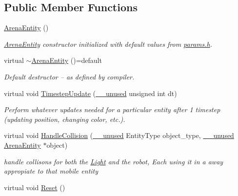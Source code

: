 \subsection*{Public Member Functions}
\begin{DoxyCompactItemize}
\item 
\hyperlink{class_arena_entity_a96df749814e89344a6149e4da89b4e44}{Arena\+Entity} ()\hypertarget{class_arena_entity_a96df749814e89344a6149e4da89b4e44}{}\label{class_arena_entity_a96df749814e89344a6149e4da89b4e44}

\begin{DoxyCompactList}\small\item\em \hyperlink{class_arena_entity}{Arena\+Entity} constructor initialized with default values from \hyperlink{params_8h}{params.\+h}. \end{DoxyCompactList}\item 
virtual \hyperlink{class_arena_entity_aa7af53e5d8830d144ccf2ad07d9140da}{$\sim$\+Arena\+Entity} ()=default\hypertarget{class_arena_entity_aa7af53e5d8830d144ccf2ad07d9140da}{}\label{class_arena_entity_aa7af53e5d8830d144ccf2ad07d9140da}

\begin{DoxyCompactList}\small\item\em Default destructor -- as defined by compiler. \end{DoxyCompactList}\item 
virtual void \hyperlink{class_arena_entity_a203613c40a5cecf47606b2a59adcc3bd}{Timestep\+Update} (\hyperlink{common_8h_a2e3484535ee610c8e19e9859563abe48}{\+\_\+\+\_\+unused} unsigned int dt)
\begin{DoxyCompactList}\small\item\em Perform whatever updates needed for a particular entity after 1 timestep (updating position, changing color, etc.). \end{DoxyCompactList}\item 
virtual void \hyperlink{class_arena_entity_aa9a83946e47cf824ce50325a4599eea8}{Handle\+Collision} (\hyperlink{common_8h_a2e3484535ee610c8e19e9859563abe48}{\+\_\+\+\_\+unused} Entity\+Type object\+\_\+type, \hyperlink{common_8h_a2e3484535ee610c8e19e9859563abe48}{\+\_\+\+\_\+unused} \hyperlink{class_arena_entity}{Arena\+Entity} $\ast$object)
\begin{DoxyCompactList}\small\item\em handle collisons for both the \hyperlink{class_light}{Light} and the robot, Each using it in a away appropiate to that mobile entity \end{DoxyCompactList}\item 
virtual void \hyperlink{class_arena_entity_abaebe6c02659e22c08579d49829c5676}{Reset} ()\hypertarget{class_arena_entity_abaebe6c02659e22c08579d49829c5676}{}\label{class_arena_entity_abaebe6c02659e22c08579d49829c5676}


\end{DoxyCompactItemize}

